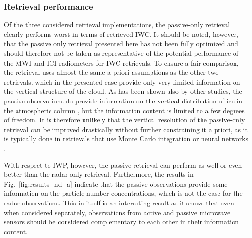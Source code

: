 \documentclass[journal abbreviation, manuscript]{copernicus}
\begin{document}
\subsubsection{Retrieval performance}

Of the three considered retrieval implementations, the passive-only retrieval
clearly performs worst in terms of retrieved IWC. It should be noted, however,
that the passive only retrieval presented here has not been fully optimized and
should therefore not be taken as representative of the potential performance of
the MWI and ICI radiometers for IWC retrievals. To ensure a fair comparison, the
retrieval uses almost the same a priori assumptions as the other two retrievals,
which in the presented case provide only very limited information on the
vertical structure of the cloud. As has been shown also by other studies, the
passive observations do provide information on the vertical distribution of ice
in the atmospheric column \citep{wang17, grutzun18}, but the information content
is limited to a few degrees of freedom. It is therefore unlikely that the
vertical resolution of the passive-only retrieval can be improved drastically
without further constraining it a priori, as it is typically done in retrievals
that use Monte Carlo integration or neural networks \citep{pfreundschuh18}.

With respect to IWP, however, the passive retrieval can perform as well or even
better than the radar-only retrieval. Furthermore, the results in
Fig.~\ref{fig:results_nd_a} indicate that the passive observations provide some
information on the particle number concentrations, which is not the case for the
radar observations. This in itself is an interesting result as it shows that
even when considered separately, observations from active and passive microwave
sensors should be considered complementary to each other in their information
content.
\end{document}
